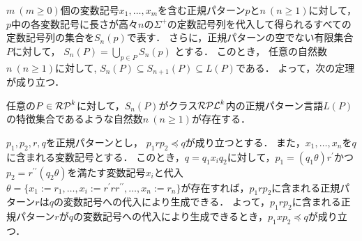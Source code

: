 
$m~(m\geq 0)$個の変数記号$x_{1},\ldots, x_{m}$を含む正規パターン$p$と$n~(n\geq 1)$に対して，%
$p$中の各変数記号に長さが高々$n$の$\Sigma^{+}$の定数記号列を代入して得られるすべての定数記号列の集合を$S_{n}(p)$で表す．
さらに，正規パターンの空でない有限集合$P$に対して，
$S_{n}(P)= \bigcup_{p \in P} S_{n}(p)$
とする．
このとき，
任意の自然数$n~(n \ge 1)$に対して, $S_{n}(P) \subseteq S_{n+1}(P) \subseteq L(P)$である．
よって，次の定理が成り立つ．
\begin{thm}
任意の$P \in \mathcal{RP}^{k}$に対して，$S_{n}(P)$がクラス$\mathcal{RPL}^{k}$内の正規パターン言語$L(P)$の特徴集合であるような自然数$n~(n \ge 1)$が存在する．
\end{thm}

$p_{1},p_{2},r,q$を正規パターンとし，
$p_{1}rp_{2} \preceq q$が成り立つとする．
また，$x_{1}, \ldots, x_{n}$を$q$に含まれる変数記号とする．
このとき，$q=q_{1}x_{i}q_{2}$に対して，$p_{1}=(q_{1} \theta )r^{\prime}$かつ$p_{2}=r^{\prime\prime}(q_{2} \theta )$を満たす変数記号$x_{i}$と代入$\theta =
\{ x_{1} := r_{1}, \ldots , x_{i} := r^{\prime}rr^{\prime\prime}, \ldots , x_{n} := r_{n} \}$が存在すれば，$p_{1}rp_{2}$に含まれる正規パターン$r$は$q$の変数記号への代入により生成できる．
よって，$p_{1}rp_{2}$に含まれる正規パターン$r$が$q$の変数記号への代入により生成できるとき，$p_{1}xp_{2} \preceq q$が成り立つ．

